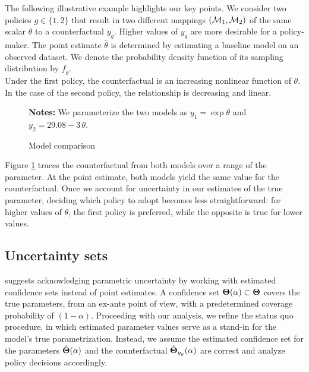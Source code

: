 \noindent The following illustrative example highlights our key points. We consider two policies $g \in\{1, 2\}$  that result in two different mappings $ (\mathcal{M}_1, \mathcal{M}_2)$ of the same scalar $\theta$ to a counterfactual $y_g$. Higher values of $y_g$ are more desirable for a policy-maker. The point estimate $\hat{\theta}$ is determined by estimating a baseline model on an observed dataset. We denote the probability density function of its sampling distribution by $f_{\hat{\theta}}$.\\

\noindent Under the first policy, the counterfactual is an increasing nonlinear function of $\theta$. In the case of the second policy, the relationship is decreasing and linear.
%
\begin{figure}[ht!]\centering
{}
\caption{Model comparison}\label{Illustration model comparison}
\begin{center}
\begin{minipage}[t]{0.6\columnwidth}
\item \scriptsize{\textbf{Notes:} We parameterize the two models as $y_1  = \exp{\theta}$ and $y_2 = 29.08 -3\, \theta$.}
\end{minipage}\end{center}
\end{figure}\FloatBarrier
%
\noindent Figure \ref{Illustration model comparison} traces the counterfactual from both models over a range of the parameter. At the point estimate, both models yield the same value for the counterfactual. Once we account for uncertainty in our estimates of the true parameter, deciding which policy to adopt becomes less straightforward: for higher values of $\theta$, the first policy is preferred, while the opposite is true for lower values.%
\subsection{Uncertainty sets}\label{Uncertainty set}
\citet{Manski.2021} suggests acknowledging parametric uncertainty by working with estimated confidence sets instead of point estimates. A confidence set $\bm{\Theta}(\alpha) \subset \bm{\Theta}$ covers the true parameters, from an ex-ante point of view, with a predetermined coverage probability of $(1 - \alpha)$. Proceeding with our analysis, we refine the status quo procedure, in which estimated parameter values serve as a stand-in for the model's true parametrization. Instead, we assume the estimated confidence set for the parameters  $\hat{\bm{\Theta}}(\alpha)$ and the counterfactual $\hat{\bm{\Theta}}_{y_g}(\alpha)$ are correct and analyze policy decisions accordingly. \\

